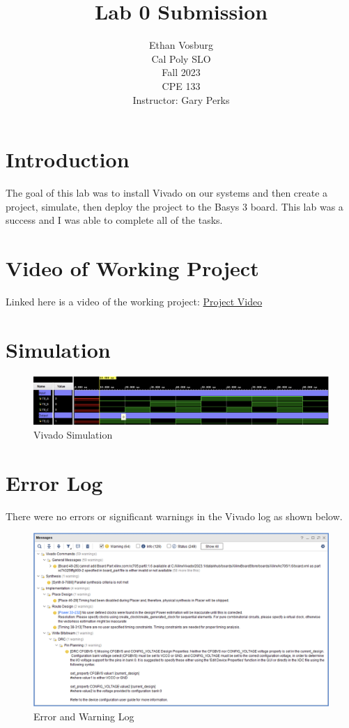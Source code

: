 \documentclass[12pt]{article}
\title{Lab 0 Submission}
\author{Ethan Vosburg\\
    Cal Poly SLO \\
    Fall 2023\\
    CPE 133\\
    Instructor: Gary Perks
}
\begin{document}
\maketitle

\newpage

\section{Introduction}

The goal of this lab was to install Vivado on our systems and then create a project, simulate, then deploy the project to the Basys 3 board. This lab was a success and I was able to complete all of the tasks.

\section{Video of Working Project}

Linked here is a video of the working project: \href{https://youtu.be/B951sAFf-O0}{Project Video}

\section{Simulation}

\begin{figure}[h]
    \centering
    \includegraphics[width=1\textwidth]{CPE 133 Lab 0 Simulation.png}
    \caption{Vivado Simulation}
    \label{fig:simulation}
\end{figure}


\newpage

\section{Error Log}

There were no errors or significant warnings in the Vivado log as shown below.

\begin{figure}[h]
    \centering
    \includegraphics[width=.95\textwidth]{CPE 133 Lab 0 Warning Log.png}
    \caption{Error and Warning Log}
    \label{fig:warninglog}
\end{figure}
\end{document}
